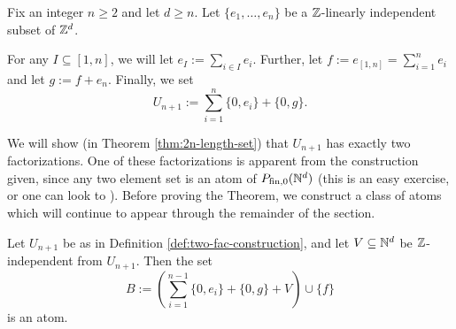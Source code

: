 \begin{defn} \label{def:two-fac-construction} 
	Fix an integer $n\ge 2$ and let $d\ge n$.
	Let $\{e_1,\dots,e_n\}$ be a $\mathbb{Z}$-linearly independent subset of $\mathbb{Z}^d$.
	
	For any $I \subseteq [ 1,n ]$, we will let $e_I := \sum_{i\in I} e_i$.
	Further, let $f := e_{[ 1,n ]} = \sum_{i=1}^n e_i$ and let $g := f + e_n$.
	Finally, we set
	\[U_{n+1} := \sum_{i=1}^n \{0,e_i\} + \{0,g\}.\]
\end{defn}

We will show (in Theorem \ref{thm:2n-length-set}) that $U_{n+1}$ has exactly two factorizations. 
One of these factorizations is apparent from the construction given, since any two element set is an atom of $P_{\textrm{fin}, 0}(\mathbb{N}^d)$ (this is an easy exercise, or one can look to \cite[Proposition 4.1(iv)]{fan-tringali18}).
Before proving the Theorem, we construct a class of atoms which will continue to appear through the remainder of the section.

\begin{lemma} \label{lem:large-atom-two-fac}
	Let $U_{n+1}$ be as in Definition \ref{def:two-fac-construction}, and let $V\subseteq \mathbb{N}^d$ be $\mathbb{Z}$-independent from $U_{n+1}$.
	Then the set
	\[ B:= \left( \sum_{i=1}^{n-1} \{0,e_i\} + \{0,g\} + V \right) \cup \{f\} \]
	is an atom.
\end{lemma}

